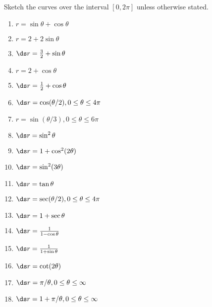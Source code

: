 \begin{enumialphparenastyle}
\begin{ex}
\noindent Sketch the curves over the interval $[0,2\pi]$ unless
otherwise stated.
\begin{multicols}{3}
\begin{enumerate}
	\item	$r=\sin\theta+\cos\theta$
	\item	$r=2+2\sin\theta$
	\item	$\ds r={3\over2}+\sin\theta$
	\item	$r= 2+\cos\theta$
	\item	$\ds r={1\over2}+\cos\theta$
	\item	$\ds r=\cos(\theta/2), 0\le\theta\le4\pi$
	\item	$r=\sin(\theta/3), 0\le\theta\le6\pi$
	\item	$\ds r=\sin^2\theta$
	\item	$\ds r=1+\cos^2(2\theta)$
	\item	$\ds r=\sin^2(3\theta)$
	\item	$\ds r=\tan\theta$
	\item	$\ds r=\sec(\theta/2), 0\le\theta\le4\pi$
	\item	$\ds r=1+\sec\theta$
	\item	$\ds r={1\over 1-\cos\theta}$
	\item	$\ds r={1\over 1+\sin\theta}$
	\item	$\ds r=\cot(2\theta)$
	\item	$\ds r=\pi/\theta, 0\le\theta\le\infty$
	\item	$\ds r=1+\pi/\theta, 0\le\theta\le\infty$
\end{enumerate}
\end{multicols}
\end{ex}

\end{enumialphparenastyle}